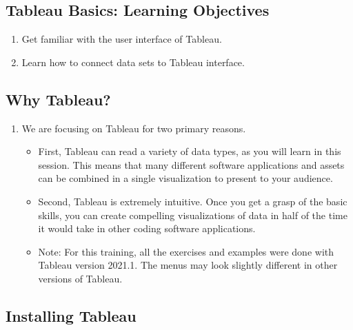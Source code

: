 \documentclass[
]{book}
\providecommand{\tightlist}{%
  \setlength{\itemsep}{0pt}\setlength{\parskip}{0pt}}
\begin{document}
\hypertarget{tableau-basics-learning-objectives}{%
\subsection{Tableau Basics: Learning Objectives}\label{tableau-basics-learning-objectives}}

\begin{enumerate}
\def\labelenumi{\arabic{enumi}.}
\item
  Get familiar with the user interface of Tableau.
\item
  Learn how to connect data sets to Tableau interface.
\end{enumerate}

\hypertarget{why-tableau}{%
\subsection{Why Tableau?}\label{why-tableau}}

\begin{enumerate}
\def\labelenumi{\arabic{enumi}.}
\tightlist
\item
  We are focusing on Tableau for two primary reasons.

  \begin{itemize}
  \tightlist
  \item
    First, Tableau can read a variety of data types, as you will learn in this session. This means that many different software applications and assets can be combined in a single visualization to present to your audience.
  \item
    Second, Tableau is extremely intuitive. Once you get a grasp of the basic skills, you can create compelling visualizations of data in half of the time it would take in other coding software applications.
  \item
    Note: For this training, all the exercises and examples were done with Tableau version 2021.1. The menus may look slightly different in other versions of Tableau.
  \end{itemize}
\end{enumerate}

\hypertarget{installing-tableau}{%
\subsection{Installing Tableau}\label{installing-tableau}}
\end{document}
